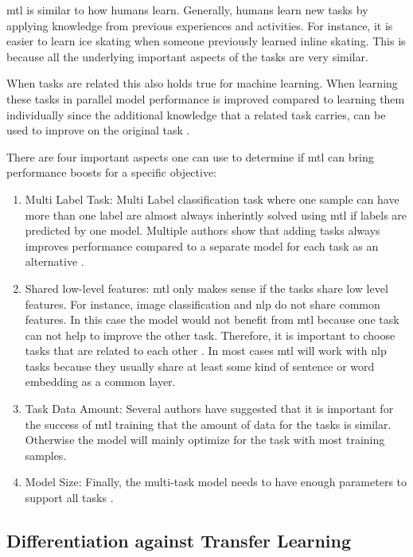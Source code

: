 \gls{mtl} is similar to how humans learn. Generally, humans learn new tasks by applying knowledge from previous experiences and activities. For instance, it is easier to learn ice skating when someone previously learned inline skating. This is because all the underlying important aspects of the tasks are very similar.

When tasks are related this also holds true for machine learning. When learning these tasks in parallel model performance is improved compared to learning them individually since the additional knowledge that a related task carries, can be used to improve on the original task \cite{Caruana1997a}. 

There are four important aspects one can use to determine if \gls{mtl} can bring performance boosts for a specific objective:
\begin{enumerate}
	\item Multi Label Task: Multi Label classification task where one sample can have more than one label are almost always inherintly solved using \gls{mtl} if labels are predicted by one model. Multiple authors show that adding tasks always improves performance compared to a separate model for each task as an alternative \cite{Ramsundar2015}. %
	\item Shared low-level features: \gls{mtl} only makes sense if the tasks share low level features. For instance, image classification and \gls{nlp} do not share common features. In this case the model would not benefit from \gls{mtl} because one task can not help to improve the other task. Therefore, it is important to choose tasks that are related to each other \cite{Zhang2017a}. In most cases \gls{mtl} will work with \gls{nlp} tasks because they usually share at least some kind of sentence or word embedding as a common layer.   %
	\item Task Data Amount: Several authors have suggested that it is important for the success of \gls{mtl} training that the amount of data for the tasks is similar. Otherwise the model will mainly optimize for the task with most training samples.
	\item Model Size: Finally, the multi-task model needs to have enough parameters to support all tasks \cite{Caruana1997a}. 
	\end{enumerate}


\subsection{Differentiation against Transfer Learning}

